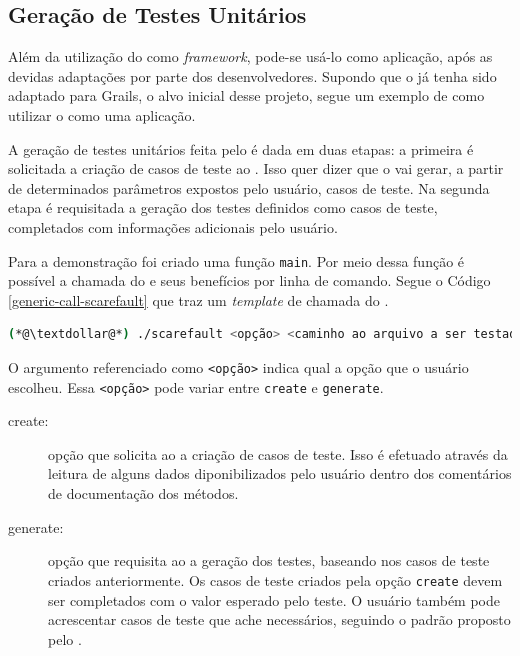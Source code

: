 \subsection{Geração de Testes Unitários}
Além da utilização do \scarefault como \textit{framework}, pode-se usá-lo como
aplicação, após as devidas adaptações por parte dos desenvolvedores. Supondo
que o \scarefault já tenha sido adaptado para  \textsf{Grails}, o alvo inicial
desse projeto, segue um exemplo de como utilizar o \scarefault como uma
aplicação.

A geração de testes unitários feita pelo \scarefault é dada em duas etapas:
a primeira é solicitada a criação de casos de teste ao \Scarefault. Isso
quer dizer que o \scarefault vai gerar, a partir de determinados parâmetros
expostos pelo usuário, casos de teste. Na segunda etapa é requisitada a
geração dos testes definidos como casos de teste, completados com informações
adicionais pelo usuário.

Para a demonstração foi criado uma função \lstinline|main|. Por meio dessa
função é possível a chamada do \scarefault e seus benefícios por linha
de comando. Segue o Código \ref{generic-call-scarefault} que traz um
\textit{template} de chamada do \Scarefault.

\begin{lstlisting}[language=bash, label=generic-call-scarefault, caption=Template para chamada do \scarefault pela linha de comando]
(*@\textdollar@*) ./scarefault <opção> <caminho ao arquivo a ser testado> [categoria do padrão MVC]
\end{lstlisting}

O argumento referenciado como \lstinline|<opção>| indica qual a opção que o
usuário escolheu. Essa \lstinline|<opção>| pode variar entre \lstinline|create|
e \lstinline|generate|.
\begin{description}
\item[\textsf{create}:] opção que solicita ao \scarefault a criação de
casos de teste. Isso é efetuado através da leitura de alguns dados
diponibilizados pelo usuário dentro dos comentários de documentação dos
métodos.
\item[\textsf{generate}:] opção que requisita ao \scarefault a geração
dos testes, baseando nos casos de teste criados anteriormente. Os casos de
teste criados pela opção \lstinline|create| devem ser completados com o
valor esperado pelo teste. O usuário também pode acrescentar casos de teste
que ache necessários, seguindo o padrão proposto pelo \Scarefault.
\end{description}

